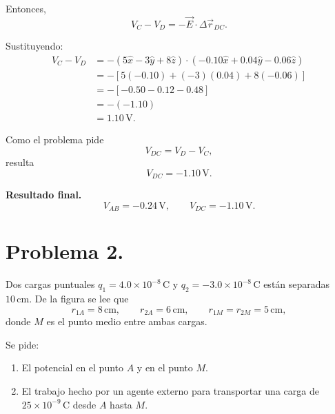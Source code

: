 \documentclass[11pt]{article}
\begin{document}
Entonces,
\begin{equation*}
    V_C-V_D=-\vec E\cdot\Delta \vec r_{DC}.
\end{equation*}

Sustituyendo:
\begin{align*}
    V_C-V_D
    &=-\left(5\hat{x}-3\hat{y}+8\hat{z}\right)\cdot
      \left(-0.10\hat{x}+0.04\hat{y}-0.06\hat{z}\right)\\
    &=-\left[5(-0.10)+(-3)(0.04)+8(-0.06)\right]\\
    &=-\left[-0.50-0.12-0.48\right]\\
    &=-(-1.10)\\
    &=1.10\,\text{V}.
\end{align*}

Como el problema pide
\begin{equation*}
    V_{DC}=V_D-V_C,
\end{equation*}
resulta
\begin{equation*}
    \boxed{V_{DC}=-1.10\,\text{V}.}
\end{equation*}

\textbf{Resultado final.}
\begin{equation*}
    \boxed{V_{AB}=-0.24\,\text{V}},
    \qquad
    \boxed{V_{DC}=-1.10\,\text{V}}.
\end{equation*}

\newpage

\section*{Problema 2.}
Dos cargas puntuales $q_1=4.0\times 10^{-8}\,\text{C}$ y $q_2=-3.0\times 10^{-8}\,\text{C}$ est\'an separadas $10\,\text{cm}$. De la figura se lee que
\begin{equation*}
    r_{1A}=8\,\text{cm},
    \qquad
    r_{2A}=6\,\text{cm},
    \qquad
    r_{1M}=r_{2M}=5\,\text{cm},
\end{equation*}
donde $M$ es el punto medio entre ambas cargas.

Se pide:
\begin{enumerate}[label=(\alph*)]
    \item El potencial en el punto $A$ y en el punto $M$.
    \item El trabajo hecho por un agente externo para transportar una carga de $25\times 10^{-9}\,\text{C}$ desde $A$ hasta $M$.
\end{enumerate}
\end{document}
